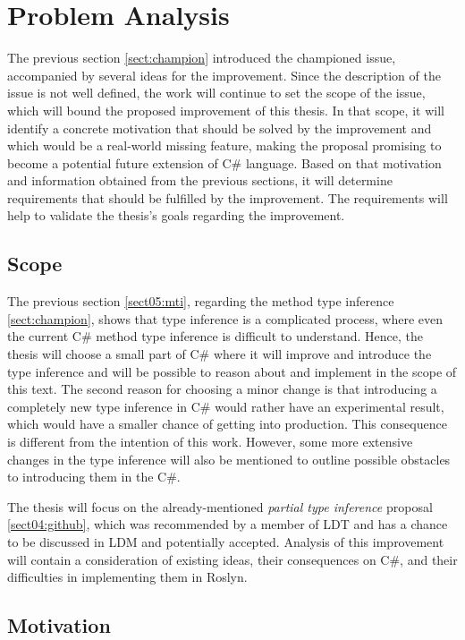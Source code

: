 \chapter{Problem Analysis}

The previous section \ref{sect:champion} introduced the championed issue, accompanied by several ideas for the improvement.
Since the description of the issue is not well defined, the work will continue to set the scope of the issue, which will bound the proposed improvement of this thesis. 
In that scope, it will identify a concrete motivation that should be solved by the improvement and which would be a real-world missing feature, making the proposal promising to become a potential future extension of C\# language. 
Based on that motivation and information obtained from the previous sections, it will determine requirements that should be fulfilled by the improvement. 
The requirements will help to validate the thesis’s goals regarding the improvement.

\section{Scope}

The previous section \ref{sect05:mti}, regarding the method type inference \ref{sect:champion}, shows that type inference is a complicated process, where even the current C\# method type inference is difficult to understand. 
Hence, the thesis will choose a small part of C\# where it will improve and introduce the type inference and will be possible to reason about and implement in the scope of this text. 
The second reason for choosing a minor change is that introducing a completely new type inference in C\# would rather have an experimental result, which would have a smaller chance of getting into production. 
This consequence is different from the intention of this
work. 
However, some more extensive changes in the type inference will also be mentioned to outline possible obstacles to introducing them in the C\#.
\par
The thesis will focus on the already-mentioned \textit{partial type inference} proposal \ref{sect04:github}, which was recommended by a member of LDT and has a chance to be discussed in LDM and potentially accepted. 
Analysis of this improvement will contain a consideration of existing ideas, their consequences on C\#, and their difficulties in implementing them in Roslyn.

\section{Motivation} \label{sect10:mot}

